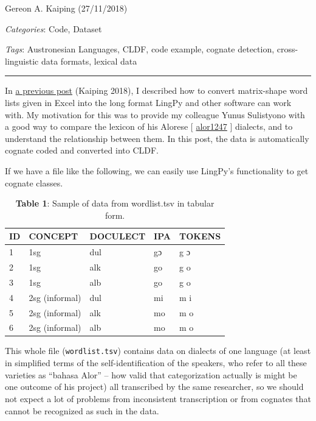 \documentclass[
  a4paper,
  14pt,
  oneside,
  tablecaptionabove
]{scrbook}
\begin{document}
Gereon A. Kaiping (27/11/2018)

\emph{Categories}: Code, Dataset

\emph{Tags}: Austronesian Languages, CLDF, code example, cognate
detection, cross-linguistic data formats, lexical data

\begin{center}\rule{0.5\linewidth}{1pt}\end{center}

In \href{https://calc.hypotheses.org/803}{a previous post} (Kaiping
2018), I described how to convert matrix-shape word lists given in Excel
into the long format LingPy and other software can work with. My
motivation for this was to provide my colleague Yunus Sulistyono with a
good way to compare the lexicon of his Alorese {[}
\href{https://glottolog.org/resource/languoid/id/alor1247}{alor1247} {]}
dialects, and to understand the relationship between them. In this post,
the data is automatically cognate coded and converted into CLDF.


If we have a file like the following, we can easily use LingPy's
functionality to get cognate classes.

\begin{table}[h]
\centering
\begin{tabular}{@{}lllll@{}}
\toprule
ID & CONCEPT        & DOCULECT & IPA & TOKENS \\ \midrule
1  & 1sg            & dul      & gɔ  & g ɔ    \\
2  & 1sg            & alk      & go  & g o    \\
3  & 1sg            & alb      & go  & g o    \\
4  & 2sg (informal) & dul      & mi  & m i    \\
5  & 2sg (informal) & alk      & mo  & m o    \\
6  & 2sg (informal) & alb      & mo  & m o    \\ \bottomrule
\end{tabular}
\captionsetup{justification=centering}
\caption*{\small \textbf{Table 1}: Sample of data from wordlist.tsv in tabular form.}
\label{tab:my-table}
\end{table}
 
This whole file (\lstinline!wordlist.tsv!) contains
data on dialects of one language (at least in simplified terms of the
self-identification of the speakers, who refer to all these varieties as
\enquote{bahasa Alor} -- how valid that categorization actually is might
be one outcome of his project) all transcribed by the same researcher,
so we should not expect a lot of problems from inconsistent
transcription or from cognates that cannot be recognized as such in the
data.
\end{document}
